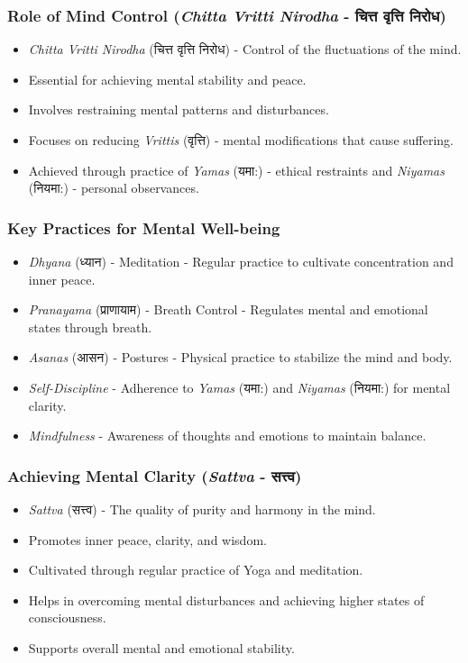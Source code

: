 \begin{frame}[fragile]\frametitle{Role of Mind Control (\textit{Chitta Vritti Nirodha} - चित्त वृत्ति निरोध)}

      \begin{itemize}
		\item \textit{Chitta Vritti Nirodha} (चित्त वृत्ति निरोध) - Control of the fluctuations of the mind.
		\item Essential for achieving mental stability and peace.
		\item Involves restraining mental patterns and disturbances.
		\item Focuses on reducing \textit{Vrittis} (वृत्ति) - mental modifications that cause suffering.
		\item Achieved through practice of \textit{Yamas} (यमा:) - ethical restraints and \textit{Niyamas} (नियमा:) - personal observances.
	  \end{itemize}

\end{frame}

\begin{frame}[fragile]\frametitle{Key Practices for Mental Well-being}

      \begin{itemize}
		\item \textit{Dhyana} (ध्यान) - Meditation - Regular practice to cultivate concentration and inner peace.
		\item \textit{Pranayama} (प्राणायाम) - Breath Control - Regulates mental and emotional states through breath.
		\item \textit{Asanas} (आसन) - Postures - Physical practice to stabilize the mind and body.
		\item \textit{Self-Discipline} - Adherence to \textit{Yamas} (यमा:) and \textit{Niyamas} (नियमा:) for mental clarity.
		\item \textit{Mindfulness} - Awareness of thoughts and emotions to maintain balance.
	  \end{itemize}

\end{frame}

\begin{frame}[fragile]\frametitle{Achieving Mental Clarity (\textit{Sattva} - सत्त्व)}

      \begin{itemize}
		\item \textit{Sattva} (सत्त्व) - The quality of purity and harmony in the mind.
		\item Promotes inner peace, clarity, and wisdom.
		\item Cultivated through regular practice of Yoga and meditation.
		\item Helps in overcoming mental disturbances and achieving higher states of consciousness.
		\item Supports overall mental and emotional stability.
	  \end{itemize}

\end{frame}

